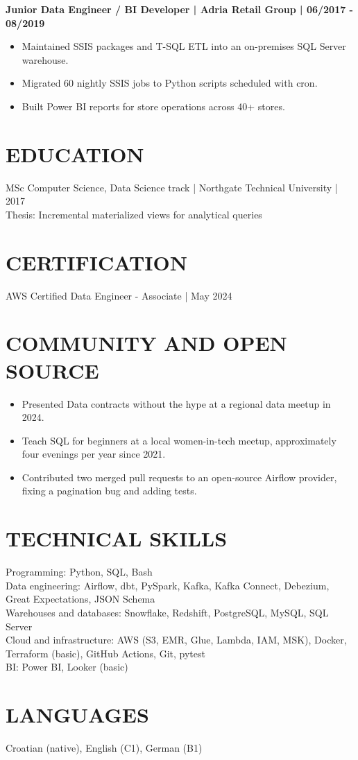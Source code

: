 \documentclass[11pt,a4paper]{article}
\begin{document}
\textbf{Junior Data Engineer / BI Developer | Adria Retail Group | 06/2017 - 08/2019}
\begin{itemize}
\item Maintained SSIS packages and T-SQL ETL into an on-premises SQL Server warehouse.
\item Migrated 60 nightly SSIS jobs to Python scripts scheduled with cron.
\item Built Power BI reports for store operations across 40+ stores.
\end{itemize}

\section*{EDUCATION}
MSc Computer Science, Data Science track | Northgate Technical University | 2017\\
Thesis: Incremental materialized views for analytical queries

\section*{CERTIFICATION}
AWS Certified Data Engineer - Associate | May 2024

\section*{COMMUNITY AND OPEN SOURCE}
\begin{itemize}
\item Presented Data contracts without the hype at a regional data meetup in 2024.
\item Teach SQL for beginners at a local women-in-tech meetup, approximately four evenings per year since 2021.
\item Contributed two merged pull requests to an open-source Airflow provider, fixing a pagination bug and adding tests.
\end{itemize}

\section*{TECHNICAL SKILLS}
Programming: Python, SQL, Bash\\
Data engineering: Airflow, dbt, PySpark, Kafka, Kafka Connect, Debezium, Great Expectations, JSON Schema\\
Warehouses and databases: Snowflake, Redshift, PostgreSQL, MySQL, SQL Server\\
Cloud and infrastructure: AWS (S3, EMR, Glue, Lambda, IAM, MSK), Docker, Terraform (basic), GitHub Actions, Git, pytest\\
BI: Power BI, Looker (basic)

\section*{LANGUAGES}
Croatian (native), English (C1), German (B1)
\end{document}
